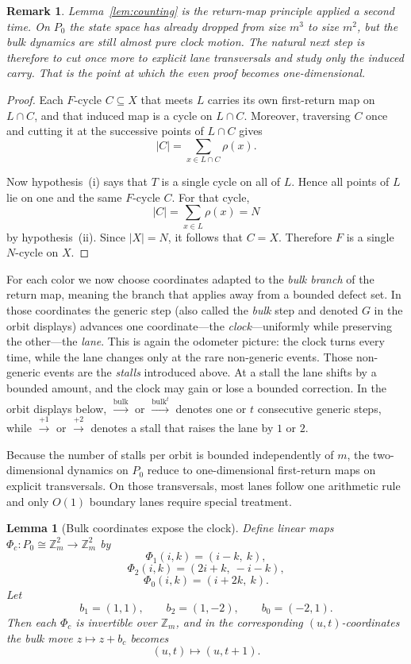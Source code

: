 \documentclass[11pt]{article}
\newtheorem{lemma}{Lemma}
\newtheorem{remark}{Remark}
\newcommand{\Zm}{\mathbb Z_m}
\newcommand{\bulk}{\mathrm{bulk}}   %
\begin{document}
\begin{remark}
Lemma~\ref{lem:counting} is the return-map principle applied a second time.
On $P_0$ the state space has already dropped from size $m^3$ to size $m^2$, but the bulk dynamics are still almost pure clock motion.
The natural next step is therefore to cut once more to explicit lane transversals and study only the induced carry.
That is the point at which the even proof becomes one-dimensional.
\end{remark}

\begin{proof}
Each $F$-cycle $C\subseteq X$ that meets $L$ carries its own first-return map on
$L\cap C$, and that induced map is a cycle on $L\cap C$.
Moreover, traversing $C$ once and cutting it at the successive points of
$L\cap C$ gives
\[
|C|=\sum_{x\in L\cap C}\rho(x).
\]

Now hypothesis~\textup{(i)} says that $T$ is a single cycle on all of $L$.
Hence all points of $L$ lie on one and the same $F$-cycle $C$.
For that cycle,
\[
|C|=\sum_{x\in L}\rho(x)=N
\]
by hypothesis~\textup{(ii)}.
Since $|X|=N$, it follows that $C=X$.
Therefore $F$ is a single $N$-cycle on $X$.
\end{proof}

For each color we now choose coordinates adapted to the \emph{bulk branch} of the return map, meaning the branch that applies away from a bounded defect set.
In those coordinates the generic step (also called the \emph{bulk} step and denoted $G$ in the orbit displays) advances one coordinate---the \emph{clock}---uniformly while preserving the other---the \emph{lane}.
This is again the odometer picture: the clock turns every time, while the lane changes only at the rare non-generic events.
Those non-generic events are the \emph{stalls} introduced above.
At a stall the lane shifts by a bounded amount, and the clock may gain or lose a bounded correction.
In the orbit displays below, $\xrightarrow{\bulk}$ or $\xrightarrow{\bulk^t}$ denotes one or $t$ consecutive generic steps, while $\xrightarrow{+1}$ or $\xrightarrow{+2}$ denotes a stall that raises the lane by $1$ or $2$.

Because the number of stalls per orbit is bounded independently of $m$, the two-dimensional dynamics on $P_0$ reduce to one-dimensional first-return maps on explicit transversals.
On those transversals, most lanes follow one arithmetic rule and only $O(1)$ boundary lanes require special treatment.

\begin{lemma}[Bulk coordinates expose the clock]\label{lem:routeE-bulkcoords}
Define linear maps $\Phi_c:P_0\cong \Zm^2\to \Zm^2$ by
\[
\Phi_1(i,k)=(i-k,\ k),
\]
\[
\Phi_2(i,k)=(2i+k,\ -i-k),
\]
\[
\Phi_0(i,k)=(i+2k,\ k).
\]
Let
\[
b_1=(1,1),\qquad b_2=(1,-2),\qquad b_0=(-2,1).
\]
Then each $\Phi_c$ is invertible over $\Zm$, and in the corresponding $(u,t)$-coordinates the bulk move $z\mapsto z+b_c$ becomes
\[
(u,t)\mapsto (u,t+1).
\]
\end{lemma}
\end{document}
